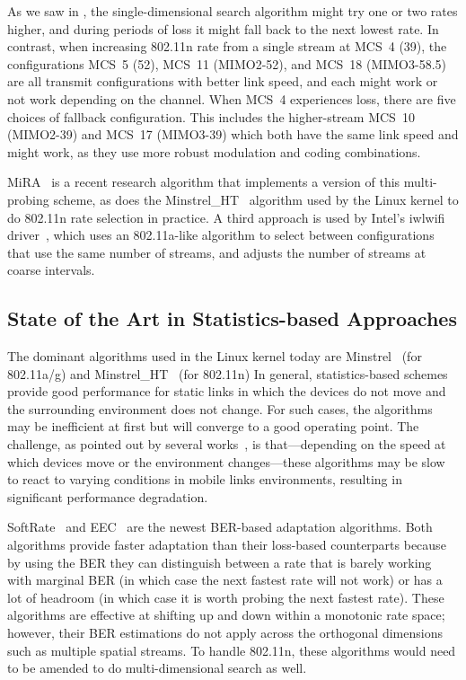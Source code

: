 As we saw in , the single-dimensional search algorithm might try one or two rates higher, and during periods of loss it might fall back to the next lowest rate. In contrast, when increasing 802.11n rate from a single stream at MCS~4 (39\Mbps), the configurations MCS~5 (52\Mbps), MCS~11 (MIMO2-52\Mbps), and MCS~18 (MIMO3-58.5\Mbps) are all transmit configurations with better link speed, and each might work or not work depending on the channel. When MCS~4 experiences loss, there are five choices of fallback configuration. This includes the higher-stream MCS~10 (MIMO2-39\Mbps) and MCS~17 (MIMO3-39\Mbps) which both have the same link speed and might work, as they use more robust modulation and coding combinations.

MiRA~\cite{Pefkianakis_MiRA} is a recent research algorithm that implements a version of this multi-probing scheme, as does the Minstrel\_HT~\cite{Minstrel_HT} algorithm used by the Linux kernel to do 802.11n rate selection in practice. A third approach is used by Intel's iwlwifi driver~\cite{iwlwifi}, which uses an 802.11a-like algorithm to select between configurations that use the same number of streams, and adjusts the number of streams at coarse intervals.

\subsection{State of the Art in Statistics-based Approaches}
The dominant algorithms used in the Linux kernel today are Minstrel~\cite{Minstrel} (for 802.11a/g) and Minstrel\_HT~\cite{Minstrel_HT} (for 802.11n)  In general, statistics-based schemes provide good performance for static links in which the devices do not move and the surrounding environment does not change. For such cases, the algorithms may be inefficient at first but will converge to a good operating point. The challenge, as pointed out by several works~\cite{Holland_RBAR,Judd_CHARM,Vutukuru_SoftRate}, is that---depending on the speed at which devices move or the environment changes---these algorithms may be slow to react to varying conditions in mobile links environments, resulting in significant performance degradation.

SoftRate~\cite{Vutukuru_SoftRate} and EEC~\cite{Chen_EEC} are the newest BER-based adaptation algorithms. Both algorithms provide faster adaptation than their loss-based counterparts because by using the BER they can distinguish between a rate that is barely working with marginal BER (in which case the next fastest rate will not work) or has a lot of headroom (in which case it is worth probing the next fastest rate). These algorithms are effective at shifting up and down within a monotonic rate space; however, their BER estimations do not apply across the orthogonal dimensions such as multiple spatial streams. To handle 802.11n, these algorithms would need to be amended to do multi-dimensional search as well.

